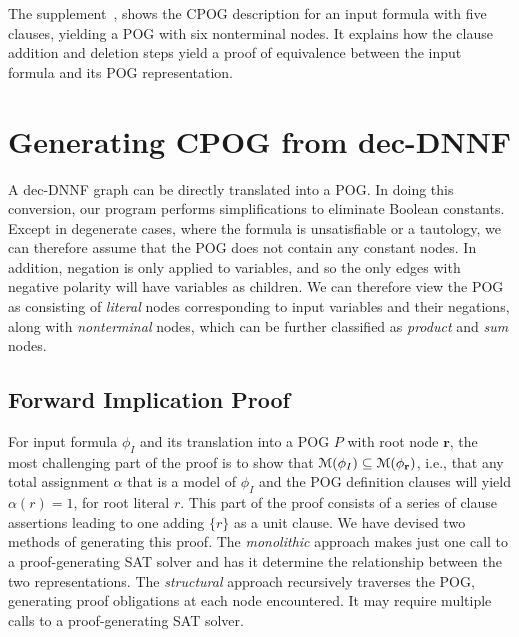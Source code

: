 \documentclass[letterpaper,USenglish,cleveref, autoref, thm-restate]{lipics-v2021}
\newcommand{\assign}{\alpha}
\newcommand{\modelset}{{\cal M}}
\newcommand{\inputformula}{\phi_I}
\newcommand{\makenode}[1]{\mathbf{#1}}
\newcommand{\noder}{\makenode{r}}
\newcommand{\progname}[1]{\textsc{#1}}
\newcommand{\dfour}{\progname{D4}}
\begin{document}
The supplement~\cite{bryant:sat:2023:supplement},
shows the CPOG description for
an input formula with five clauses, yielding a POG with six
nonterminal nodes.  It explains how the clause addition and deletion
steps yield a proof of equivalence between the input formula and its POG
representation.

\section{Generating CPOG from dec-DNNF}
\label{section:generating:cpog}

A dec-DNNF
graph can be directly translated  into a POG.
In doing this conversion,
our program performs simplifications to
eliminate Boolean constants.
Except in degenerate cases,
where the formula is unsatisfiable or a tautology,
we can therefore assume
that the POG does not contain any constant nodes.
In addition, negation is only
applied to variables, and so the only edges with negative polarity will have variables as children.
We can therefore
view the POG as consisting
of \emph{literal} nodes corresponding to input variables and their negations, along with
\emph{nonterminal} nodes, which can be further classified as \emph{product} and \emph{sum} nodes.

\subsection{Forward Implication Proof}

For input formula $\inputformula$ and its translation into a POG $P$
with root node $\noder$, the most challenging part of the proof is to
show that $\modelset(\inputformula) \subseteq \modelset(\phi_\noder)$, i.e.,
that any total assignment $\assign$ that is a model of $\inputformula$
and the POG definition clauses
will yield $\assign(r) = 1$, for root literal $r$.  This part of the
proof consists of a series of clause assertions leading to one adding
$\{r\}$ as a unit clause.  We have devised two methods of generating this
proof.  The \emph{monolithic} approach makes just one call to a
proof-generating SAT solver and has it determine the relationship
between the two representations.  The \emph{structural} approach
recursively traverses the POG, generating proof obligations at each
node encountered.  It may require multiple calls to a proof-generating SAT
solver.
\end{document}
